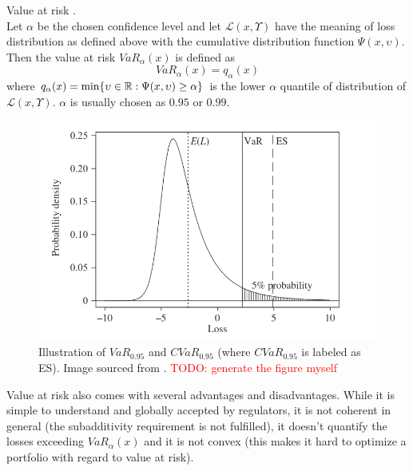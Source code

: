 \begin{defn}{Value at risk \cite[p. 275]{cornuejols_tutuncu_2006}.}  \\
Let $\alpha$ be the chosen confidence level and let $\mathcal{L}(x,\Upsilon)$ have the meaning of loss distribution as defined above with the cumulative distribution function $\Psi(x,\upsilon)$. Then the value at risk $VaR_{\alpha}(x)$ is defined as
\begin{equation*}
VaR_{\alpha}(x)=q_{\alpha}(x)
\end{equation*}
where $q_{\alpha}(x)=\mathrm{min}\{\upsilon \in \mathbb{R}: \Psi(x,\upsilon) \geq \alpha \}$ is the lower $\alpha$ quantile of distribution of $\mathcal{L}(x,\Upsilon)$. $\alpha$ is usually chosen as $0.95$ or $0.99$.
\end{defn}

\begin{figure}
  \includegraphics[width=\linewidth]{../img/VaR_CVaR_graph_theory.png}
  \caption{Illustration of $VaR_{0.95}$ and $CVaR_{0.95}$ (where $CVaR_{0.95}$ is labeled as ES). Image sourced from \cite[Figure 2.2.]{mcneil2015quantitative}. \textcolor{red}{TODO: generate the figure myself}}
  \label{fig:VaR_CVaR_graph_theory}
\end{figure}


Value at risk also comes with several advantages and disadvantages. While it is simple to understand and globally accepted by regulators, it is not coherent in general (the subadditivity requirement is not fulfilled), it doesn't quantify the losses exceeding $VaR_{\alpha}(x)$ and it is not convex (this makes it hard to optimize a portfolio with regard to value at risk).

